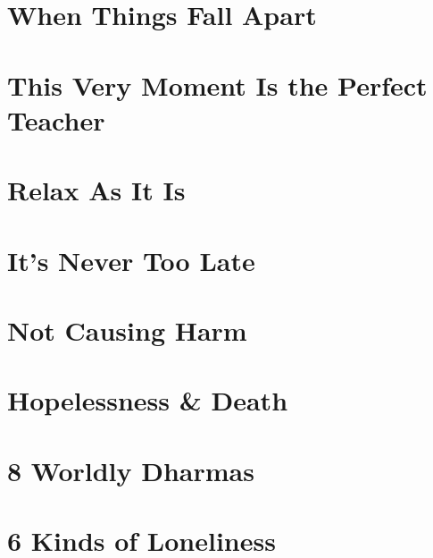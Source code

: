 \documentclass[oneside]{book}
\numberwithin{equation}{section}
\begin{document}
\section{When Things Fall Apart}


\section{This Very Moment Is the Perfect Teacher}


\section{Relax As It Is}


\section{It's Never Too Late}


\section{Not Causing Harm}


\section{Hopelessness \& Death}


\section{8 Worldly Dharmas}


\section{6 Kinds of Loneliness}
\end{document}
